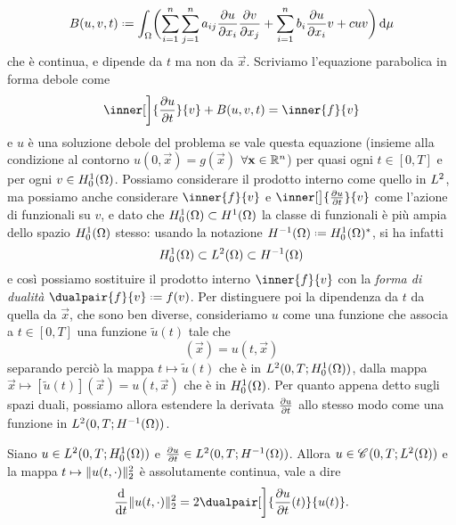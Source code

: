 \begin{equation}
    B(u,v,t)\defeq\int_\Omega\biggl(\sum_{i=1}^n\sum_{j=1}^na_{ij}\drp{u}{x_i}\drp{v}{x_j}+\sum_{i=1}^nb_i\drp{u}{x_i}v+cuv\biggr)\,\dd\mu
    \label{eq:forma-bilineare-parabolica}
\end{equation}
che è continua, e dipende da $t$ ma non da $\vec x$.
Scriviamo l'equazione parabolica in forma debole come
\begin{equation}
    \inner[\bigg]{\drp{u}{t}}{v}+B(u,v,t)=\inner{f}{v}
    \label{eq:equazione-parabolica-debole}
\end{equation}
e $u$ è una soluzione debole del problema se vale questa equazione (insieme alla condizione al contorno $u(0,\vec x)=g(\vec x)$ $\forall\vec x\in\R^n$) per quasi ogni $t\in[0,T]$ e per ogni $v\in\sobHc[1]{\Omega}$.
Possiamo considerare il prodotto interno come quello in $\lclass[2]$, ma possiamo anche considerare $\inner{f}{v}$ e $\inner[\big]{\drp{u}{t}}{v}$ come l'azione di funzionali su $v$, e dato che $\sobHc[1]{\Omega}\subset\sobH[1]{\Omega}$ la classe di funzionali è più ampia dello spazio $\sobHc[1]{\Omega}$ stesso: usando la notazione $\sobH[-1]{\Omega}\defeq\dual{\sobHc[1]{\Omega}}$, si ha infatti
\begin{equation}
    \sobHc[1]{\Omega}\subset\leb[2]{\Omega}\subset\sobH[-1]{\Omega}
\end{equation}
e cos\`i possiamo sostituire il prodotto interno $\inner{f}{v}$ con la \emph{forma di dualità} $\dualpair{f}{v}\defeq f(v)$.
Per distinguere poi la dipendenza da $t$ da quella da $\vec x$, che sono ben diverse, consideriamo $u$ come una funzione che associa a $t\in[0,T]$ una funzione $\tilde{u}(t)$ tale che
\begin{equation}
    [\tilde{u}(t)](\vec x)=u(t,\vec x)
\end{equation}
separando perciò la mappa $t\mapsto\tilde{u}(t)$ che è in $\leb[2]{0,T;\sobHc[1]{\Omega}}$, dalla mappa $\vec x\mapsto[\tilde{u}(t)](\vec x)=u(t,\vec x)$ che è in $\sobHc[1]{\Omega}$.
Per quanto appena detto sugli spazi duali, possiamo allora estendere la derivata $\drp{u}{t}$ allo stesso modo come una funzione in $\leb[2]{0,T;\sobH[-1]{\Omega}}$.
\begin{teorema}
    Siano $u\in\leb[2]{0,T;\sobHc[1]{\Omega}}$ e $\drp{u}{t}\in\leb[2]{0,T;\sobH[-1]{\Omega}}$.
    Allora $u\in\cont{0,T;\leb[2]{\Omega}}$ e la mappa $t\mapsto\norm{u(t,\cdot)}_2^2$ è assolutamente continua, vale a dire
    \begin{equation}
        \drv{}{t}\norm{u(t,\cdot)}_2^2=2\dualpair[\bigg]{\drp{u}{t}(t)}{u(t)}.
    \end{equation}
\end{teorema}

